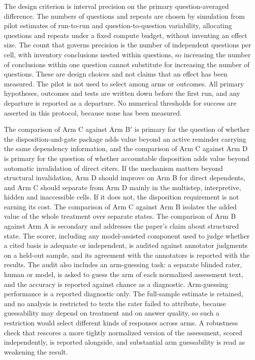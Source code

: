 \documentclass[11pt]{article}
\begin{document}
The design criterion is interval precision on the primary question-averaged difference. The numbers of questions and repeats are chosen by simulation from pilot estimates of run-to-run and question-to-question variability, allocating questions and repeats under a fixed compute budget, without inventing an effect size. The count that governs precision is the number of independent questions per cell, with inventory conclusions nested within questions, so increasing the number of conclusions within one question cannot substitute for increasing the number of questions. These are design choices and not claims that an effect has been measured. The pilot is not used to select among arms or outcomes. All primary hypotheses, outcomes and tests are written down before the first run, and any departure is reported as a departure. No numerical thresholds for success are asserted in this protocol, because none has been measured.

The comparison of Arm C against Arm B$'$ is primary for the question of whether the disposition-and-gate package adds value beyond an active reminder carrying the same dependency information, and the comparison of Arm C against Arm D is primary for the question of whether accountable disposition adds value beyond automatic invalidation of direct citers. If the mechanism matters beyond structural invalidation, Arm D should improve on Arm B for direct dependents, and Arm C should separate from Arm D mainly in the multistep, interpretive, hidden and inaccessible cells. If it does not, the disposition requirement is not earning its cost. The comparison of Arm C against Arm B isolates the added value of the whole treatment over separate states. The comparison of Arm B against Arm A is secondary and addresses the paper's claim about structured state. The scorer, including any model-assisted component used to judge whether a cited basis is adequate or independent, is audited against annotator judgments on a held-out sample, and its agreement with the annotators is reported with the results. The audit also includes an arm-guessing task: a separate blinded rater, human or model, is asked to guess the arm of each normalized assessment text, and the accuracy is reported against chance as a diagnostic. Arm-guessing performance is a reported diagnostic only. The full-sample estimate is retained, and no analysis is restricted to texts the rater failed to attribute, because guessability may depend on treatment and on answer quality, so such a restriction would select different kinds of responses across arms. A robustness check that rescores a more tightly normalized version of the assessment, scored independently, is reported alongside, and substantial arm guessability is read as weakening the result.
\end{document}
